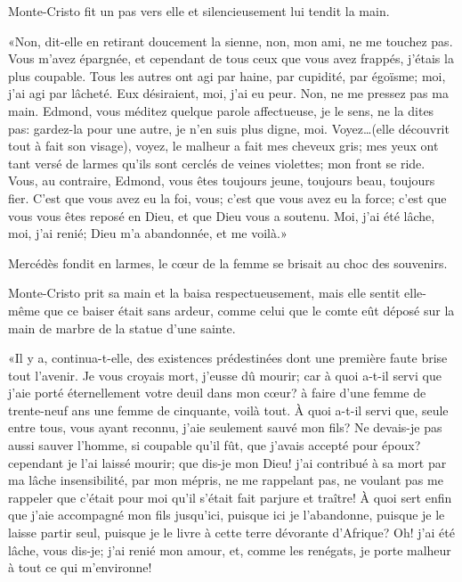 Monte-Cristo fit un pas vers elle et silencieusement lui tendit la main. 

«Non, dit-elle en retirant doucement la sienne, non, mon ami, ne me touchez pas. Vous m'avez épargnée, et cependant de tous ceux que vous avez frappés, j'étais la plus coupable. Tous les autres ont agi par haine, par cupidité, par égoïsme; moi, j'ai agi par lâcheté. Eux désiraient, moi, j'ai eu peur. Non, ne me pressez pas ma main. Edmond, vous méditez quelque parole affectueuse, je le sens, ne la dites pas: gardez-la pour une autre, je n'en suis plus digne, moi. Voyez\dots (elle découvrit tout à fait son visage), voyez, le malheur a fait mes cheveux gris; mes yeux ont tant versé de larmes qu'ils sont cerclés de veines violettes; mon front se ride. Vous, au contraire, Edmond, vous êtes toujours jeune, toujours beau, toujours fier. C'est que vous avez eu la foi, vous; c'est que vous avez eu la force; c'est que vous vous êtes reposé en Dieu, et que Dieu vous a soutenu. Moi, j'ai été lâche, moi, j'ai renié; Dieu m'a abandonnée, et me voilà.» 

Mercédès fondit en larmes, le cœur de la femme se brisait au choc des souvenirs. 

Monte-Cristo prit sa main et la baisa respectueusement, mais elle sentit elle-même que ce baiser était sans ardeur, comme celui que le comte eût déposé sur la main de marbre de la statue d'une sainte. 

«Il y a, continua-t-elle, des existences prédestinées dont une première faute brise tout l'avenir. Je vous croyais mort, j'eusse dû mourir; car à quoi a-t-il servi que j'aie porté éternellement votre deuil dans mon cœur? à faire d'une femme de trente-neuf ans une femme de cinquante, voilà tout. À quoi a-t-il servi que, seule entre tous, vous ayant reconnu, j'aie seulement sauvé mon fils? Ne devais-je pas aussi sauver l'homme, si coupable qu'il fût, que j'avais accepté pour époux? cependant je l'ai laissé mourir; que dis-je mon Dieu! j'ai contribué à sa mort par ma lâche insensibilité, par mon mépris, ne me rappelant pas, ne voulant pas me rappeler que c'était pour moi qu'il s'était fait parjure et traître! À quoi sert enfin que j'aie accompagné mon fils jusqu'ici, puisque ici je l'abandonne, puisque je le laisse partir seul, puisque je le livre à cette terre dévorante d'Afrique? Oh! j'ai été lâche, vous dis-je; j'ai renié mon amour, et, comme les renégats, je porte malheur à tout ce qui m'environne! 

